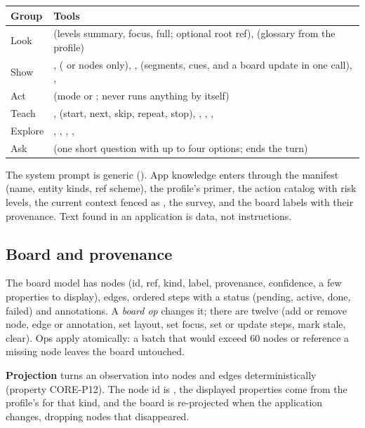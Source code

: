 \begin{xltabular}{\textwidth}{@{}L{3.2cm}Y@{}}
\toprule
\textbf{Group} & \textbf{Tools} \\
\midrule
Look &  (levels summary, focus, full; optional root ref),  (glossary from the profile) \\
Show & ,  (\pinf{} or \pill{} nodes only), ,  (segments, cues, and a board update in one call), ,  \\
Act &  (mode  or ; never runs anything by itself) \\
Teach & ,  (start, next, skip, repeat, stop), , , ,  \\
Explore & , , , ,  \\
Ask &  (one short question with up to four options; ends the turn) \\
\bottomrule
\end{xltabular}

The system prompt is generic (). App knowledge enters through the manifest (name, entity kinds, ref scheme), the profile's primer, the action catalog with risk levels, the current context fenced as , the survey, and the board labels with their provenance. Text found in an application is data, not instructions.

\subsection{Board and provenance}

The board model has nodes (id, ref, kind, label, provenance, confidence, a few properties to display), edges, ordered steps with a status (pending, active, done, failed) and annotations. A \emph{board op} changes it; there are twelve (add or remove node, edge or annotation, set layout, set focus, set or update steps, mark stale, clear). Ops apply atomically: a batch that would exceed 60 nodes or reference a missing node leaves the board untouched.

\textbf{Projection} turns an observation into nodes and edges deterministically (property CORE-P12). The node id is , the displayed properties come from the profile's  for that kind, and the board is re-projected when the application changes, dropping nodes that disappeared.

